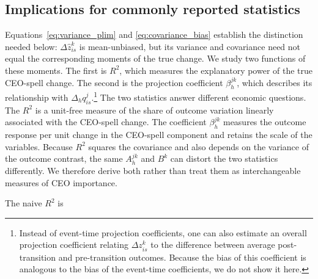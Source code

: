 \documentclass[sigconf,nonacm]{acmart}
\begin{document}
\subsection{Implications for commonly reported statistics}\label{subsec:implications}


Equations~\eqref{eq:variance_plim} and \eqref{eq:covariance_bias} establish the distinction needed below: $\Delta\widehat z_{is}^{k}$ is mean-unbiased, but its variance and covariance need not equal the corresponding moments of the true change. We study two functions of these moments. The first is $R^2$, which measures the explanatory power of the true CEO-spell change. The second is the projection coefficient $\beta_h^{jk}$, which describes its relationship with $\Delta_h q_{is}^{j}$.\footnote{Instead of event-time projection coefficients, one can also estimate an overall projection coefficient relating $\Delta z_{is}^{k}$ to the difference between average post-transition and pre-transition outcomes. Because the bias of this coefficient is analogous to the bias of the event-time coefficients, we do not show it here.}
The two statistics answer different economic questions. The $R^2$ is a unit-free measure of the share of outcome variation linearly associated with the CEO-spell change. The coefficient $\beta_h^{jk}$ measures the outcome response per unit change in the CEO-spell component and retains the scale of the variables. Because $R^2$ squares the covariance and also depends on the variance of the outcome contrast, the same $A_h^{jk}$ and $B^k$ can distort the two statistics differently. We therefore derive both rather than treat them as interchangeable measures of CEO importance.

The naive $R^2$ is
\end{document}

